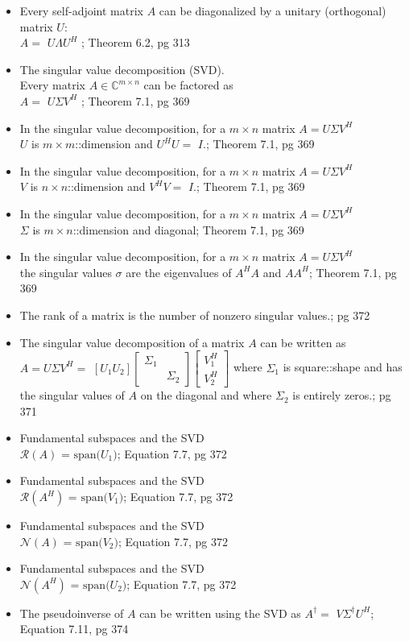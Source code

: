 \documentclass{article}
\begin{document}
\begin{multicols}{2}
\begin{itemize}
\item Every self-adjoint matrix $A$ can be diagonalized by a unitary (orthogonal) matrix $U$: \\
$A = $ $U \Lambda U^H$ ; Theorem 6.2, pg 313
\item The singular value decomposition (SVD). \\
Every matrix $A \in \mathbb{C}^{m \times n} $ can be factored as \\
$A = $ $U \Sigma V^H$ ; Theorem 7.1, pg 369
\item In the singular value decomposition, for a $m \times n$ matrix $A = U \Sigma V^H $ \\
$U$ is $m \times m$::dimension and $U^H U = $ $I$.; Theorem 7.1, pg 369
\item In the singular value decomposition, for a $m \times n$ matrix $A = U \Sigma V^H $ \\
$V$ is $n \times n$::dimension and $V^H V = $ $I$.; Theorem 7.1, pg 369
\item In the singular value decomposition, for a $m \times n$ matrix $A = U \Sigma V^H $ \\
$\Sigma$ is $m \times n$::dimension and diagonal; Theorem 7.1, pg 369
\item In the singular value decomposition, for a $m \times n$ matrix $A = U \Sigma V^H $ \\
the singular values $\sigma$ are the eigenvalues of $A^H A$ and $A A^H$; Theorem 7.1, pg 369
\item The rank of a matrix is the number of nonzero singular values.; pg 372
\item The singular value decomposition of a matrix $A$ can be written as $A = U \Sigma V^H = $ $ [U_1 U_2] \left\lbrack \begin{array}{cc} \Sigma_1  & \;\\ \; & \Sigma_2 \end{array}\right\rbrack \left\lbrack \begin{array}{c} V_1^H  \\ V_2^H \end{array}\right\rbrack $ where $\Sigma_1$ is square::shape and has the singular values of $A$ on the diagonal and where $\Sigma_2$ is entirely zeros.; pg 371
\item Fundamental subspaces and the SVD \\
$\mathcal{R}(A)$ = $ \mathrm{span}($$U_1$$)$; Equation 7.7, pg 372
\item Fundamental subspaces and the SVD \\
$\mathcal{R}(A^H)$ = $ \mathrm{span}($$V_1$$)$; Equation 7.7, pg 372
\item Fundamental subspaces and the SVD \\
$\mathcal{N}(A)$ = $ \mathrm{span}($$V_2$$)$; Equation 7.7, pg 372
\item Fundamental subspaces and the SVD \\
$\mathcal{N}(A^H)$ = $ \mathrm{span}($$U_2$$)$; Equation 7.7, pg 372
\item The pseudoinverse of $A$ can be written using the SVD as $A^\dagger = $ $V \Sigma^\dagger U^H$; Equation 7.11, pg 374
\end{itemize}


\end{multicols}
\end{document}
